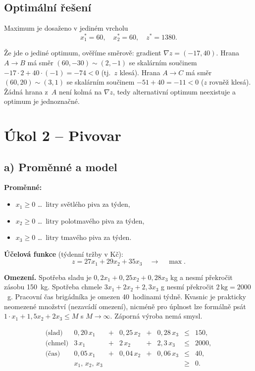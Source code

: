 \documentclass[11pt,a4paper]{article}
\begin{document}
	\subsection*{Optimální řešení}
	
	Maximum je dosaženo v jediném vrcholu
	\[
	\boxed{\;x_1^*=60,\quad x_2^*=60,\quad z^* = 1380.\;}
	\]
	
	Že jde o jediné optimum, ověříme směrově: gradient $\nabla z=(-17,40)$. Hrana $A\to B$ má směr $(60,-30)\sim(2,-1)$ se skalárním součinem $-17\cdot 2+40\cdot(-1)=-74<0$ (tj.\ $z$ klesá). Hrana $A\to C$ má směr $(60,20)\sim(3,1)$ se skalárním součinem $-51+40=-11<0$ ($z$ rovněž klesá). Žádná hrana z~$A$ není kolmá na $\nabla z$, tedy alternativní optimum neexistuje a optimum je jednoznačné.
	
	\section*{Úkol 2 -- Pivovar}
	
	\subsection*{a) Proměnné a model}
	
	\textbf{Proměnné:}
	\begin{itemize}[leftmargin=*]
		\item $x_1 \geq 0$ \dots\ litry světlého piva za týden,
		\item $x_2 \geq 0$ \dots\ litry polotmavého piva za týden,
		\item $x_3 \geq 0$ \dots\ litry tmavého piva za týden.
	\end{itemize}
	
	\textbf{Účelová funkce} (týdenní tržby v Kč):
	\[
	z = 27x_1 + 29x_2 + 35x_3 \quad\to\quad \max.
	\]
	
	\textbf{Omezení.} Spotřeba sladu je $0{,}2x_1+0{,}25x_2+0{,}28x_3$ kg a nesmí překročit zásobu 150~kg. Spotřeba chmele $3x_1+2x_2+2{,}3x_3$ g nesmí překročit $2\,\mathrm{kg}=2000$~g. Pracovní čas brigádníka je omezen 40~hodinami týdně. Kvasnic je prakticky neomezené množství (nezavádí omezení), nicméně pro úplnost lze formálně psát $1\cdot x_1+1{,}5x_2+2x_3 \leq M$ s $M\to\infty$. Záporná výroba nemá smysl.
	
	\[
	\begin{array}{rrcrcrcl}
		\text{(slad)}    & 0{,}20\,x_1 &+& 0{,}25\,x_2 &+& 0{,}28\,x_3 &\leq& 150,\\[1pt]
		\text{(chmel)}   & 3\,x_1      &+& 2\,x_2      &+& 2{,}3\,x_3  &\leq& 2000,\\[1pt]
		\text{(čas)}     & 0{,}05\,x_1 &+& 0{,}04\,x_2 &+& 0{,}06\,x_3 &\leq& 40,\\[1pt]
		& x_1,\, x_2,\, x_3 &&&&&\geq& 0.
	\end{array}
	\]
	
\end{document}
